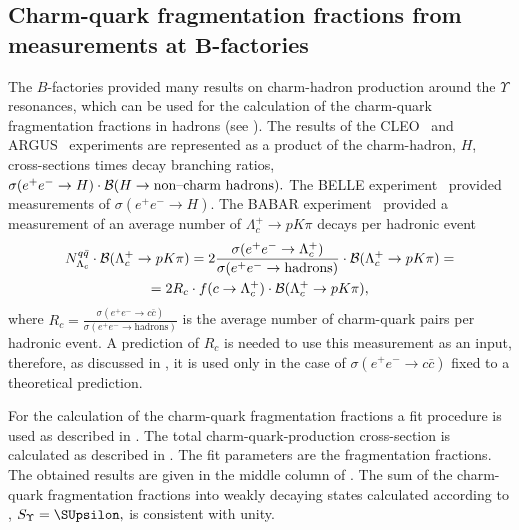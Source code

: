 \subsection{Charm-quark fragmentation fractions from measurements at 
${\pmb B}$-factories}
\label{sec:ssUPSILON}
The $B$-factories provided many results on   charm-hadron production 
around the $\Upsilon$ resonances, which can be used for the calculation 
of the charm-quark fragmentation fractions in hadrons (see 
). 
The results  of the CLEO~\cite{Bortoletto:1988kw,Avery:1990bc}
 and ARGUS~\cite{Albrecht:1991ss,
Albrecht:1991pa,
Albrecht:1988an} 
experiments are represented as a product of the
charm-hadron, $H$, cross-sections times decay branching ratios, 
$\sigma(e^+e^-\rightarrow H)\cdot {\cal B}(H\rightarrow 
\text{non--charm hadrons}).$
%
The BELLE experiment~\cite{Seuster:2005tr} provided measurements of 
$\sigma(e^+e^-\rightarrow  H)$. 
%
The BABAR experiment~\cite{Aubert:2006cp} provided a measurement of an 
average number of $\Lambda_c^+\rightarrow p K\pi$ decays per hadronic 
event 
\begin{multline*}
N^{q\bar{q}}_{\Lambda_c} \cdot {\cal B}(\Lambda_c^+\rightarrow p K\pi)=
2\frac{\sigma(e^+e^-\rightarrow  \Lambda_c^+)}{\sigma(e^+e^-\rightarrow 
\text{hadrons})} \cdot {\cal B}(\Lambda_c^+\rightarrow p K\pi)=\\
=2R_c \cdot f(c\rightarrow\Lambda_c^+) \cdot {\cal B}(\Lambda_c^+
\rightarrow p K\pi),
\end{multline*}
where 
$R_{c}=\frac{\sigma(e^+e^-\rightarrow c\bar{c})}{\sigma(e^+e^-
\rightarrow \text{hadrons})}$ is the average number of charm-quark pairs
 per hadronic event.
%
A prediction of $R_c$ is needed to use this measurement as an input, 
therefore, as discussed in , it is  used only in the 
case of $\sigma(e^+e^- \rightarrow c\bar{c})$ fixed to a theoretical 
prediction.
\tabEEUmeas

%
For the calculation of the charm-quark fragmentation fractions a fit 
procedure is used as  described in . The total 
charm-quark-production  cross-section is calculated as described in
 . 
%
%
The fit parameters 
are the fragmentation fractions. The obtained results are given  in the 
middle column of
.
%
The sum of the charm-quark  fragmentation fractions into weakly decaying 
states calculated according to , 
$S_{\Upsilon}=\SUpsilon,$ is consistent with unity.
%
\tabEEUaverage
%

